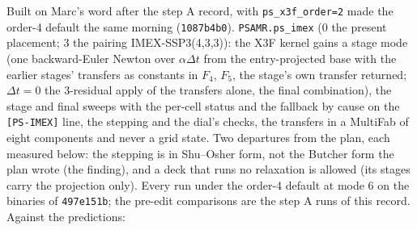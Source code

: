 \documentclass[11pt,a4paper]{article}
\newcommand{\code}[1]{\texttt{\small #1}}
\newcommand{\Dt}{\Delta t}
\begin{document}
Built on Marc's word after the step A record, with
\code{ps\_x3f\_order=2} made the order-4 default the same morning
(\code{1087b4b0}).  \code{PSAMR.ps\_imex} (0 the present placement; 3
the pairing IMEX-SSP3(4,3,3)): the X3F kernel gains a stage mode (one
backward-Euler Newton over $\alpha\Dt$ from the entry-projected base
with the earlier stages' transfers as constants in $F_4$, $F_5$, the
stage's own transfer returned; $\Dt = 0$ the 3-residual apply of the
transfers alone, the final combination),  the stage and
final sweeps with the per-cell status and the fallback by cause on the
\code{[PS-IMEX]} line,  the stepping and the
dial's checks, the transfers in a MultiFab of eight components and never
a grid state.  Two departures from the plan, each measured below: the
stepping is in Shu--Osher form, not the Butcher form the plan wrote
(the finding), and a deck that runs no relaxation is allowed (its stages
carry the projection only).  Every run under the order-4 default at
mode 6 on the binaries of \code{497e151b}; the pre-edit comparisons
are the step A runs of this record.  Against the predictions:
\end{document}
